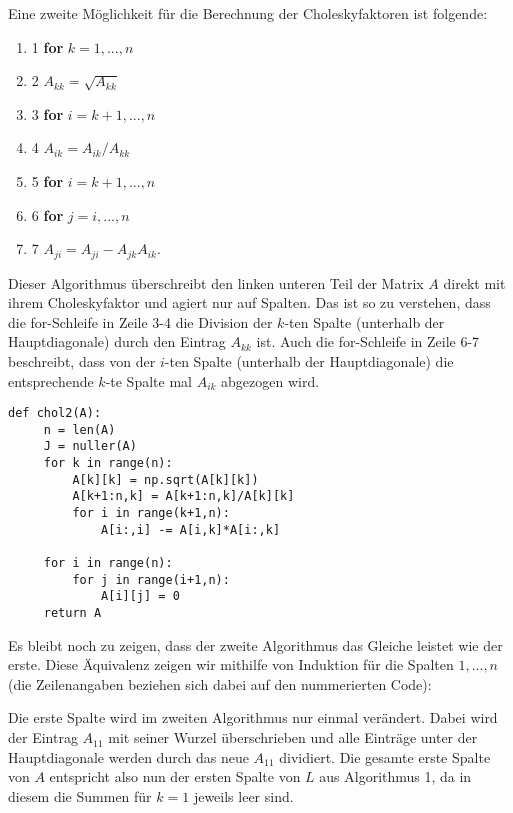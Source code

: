 \documentclass{article}
\begin{document}
Eine zweite Möglichkeit für die Berechnung der Choleskyfaktoren ist folgende: 

\begin{enumerate}
\itemsep0em
\item[] 1 \textbf{for} $k = 1,...,n$
\item[] 2 \qquad $A_{kk} = \sqrt{A_{kk}}$
\item[] 3 \qquad \textbf{for} $i = k+1,...,n$
\item[] 4 \qquad \qquad $A_{ik} = A_{ik}/A_{kk}$
\item[] 5 \qquad \textbf{for} $i = k+1,...,n$
\item[] 6 \qquad \qquad \textbf{for} $j = i,...,n$
\item[] 7 \qquad \qquad \qquad $A_{ji} = A_{ji} - A_{jk} A_{ik}$.

\end{enumerate}

Dieser Algorithmus überschreibt den linken unteren Teil der Matrix $A$ direkt mit ihrem Choleskyfaktor und agiert nur auf Spalten. Das ist so zu verstehen, dass die for-Schleife in Zeile 3-4 die Division der $k$-ten Spalte (unterhalb der Hauptdiagonale) durch den Eintrag $A_{kk}$ ist. Auch die for-Schleife in Zeile 6-7 beschreibt, dass von der $i$-ten Spalte (unterhalb der Hauptdiagonale) die entsprechende $k$-te Spalte mal $A_{ik}$ abgezogen wird.


\lstset{language=Python}
\lstset{frame=lines}
\lstset{basicstyle=\footnotesize}
\begin{lstlisting}
def chol2(A):
     n = len(A)
     J = nuller(A)
     for k in range(n):
         A[k][k] = np.sqrt(A[k][k])
         A[k+1:n,k] = A[k+1:n,k]/A[k][k]
         for i in range(k+1,n):
             A[i:,i] -= A[i,k]*A[i:,k]

     for i in range(n):
         for j in range(i+1,n):
             A[i][j] = 0
     return A
\end{lstlisting}

Es bleibt noch zu zeigen, dass der zweite Algorithmus das Gleiche leistet wie der erste. Diese Äquivalenz zeigen wir mithilfe von Induktion für die Spalten $1,...,n$ (die Zeilenangaben beziehen sich dabei auf den nummerierten Code):

Die erste Spalte wird im zweiten Algorithmus nur einmal verändert. Dabei wird der Eintrag $A_{11}$ mit seiner Wurzel überschrieben und alle Einträge unter der Hauptdiagonale werden durch das neue $A_{11}$ dividiert. Die gesamte erste Spalte von $A$ entspricht also nun der ersten Spalte von $L$ aus Algorithmus 1, da in diesem die Summen für $k=1$ jeweils leer sind.
\end{document}

